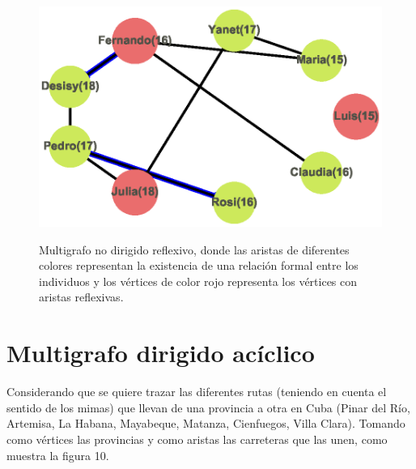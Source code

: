 \documentclass{article}
\begin{document}
\begin{center}

\end{center}
\begin{figure}[h]
\begin{center}
\includegraphics[scale=0.7]{Graf9_circular_layout.eps}\\
\caption{Multigrafo no dirigido reflexivo, donde las aristas de diferentes colores representan la existencia de una relación formal entre los individuos y los vértices de color rojo representa los vértices con aristas reflexivas.}
\end{center}
\end{figure}
\section{Multigrafo dirigido acíclico}
Considerando que se quiere trazar las diferentes rutas (teniendo en cuenta el sentido de los mimas) que llevan de una provincia a otra en Cuba (Pinar del Río, Artemisa, La Habana, Mayabeque, Matanza, Cienfuegos, Villa Clara). Tomando como vértices las provincias y como aristas las carreteras que las unen, como muestra la figura 10.\linebreak
\end{document}
